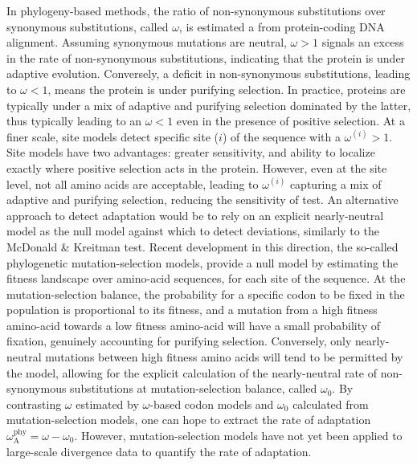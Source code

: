 \documentclass{article}
\newcommand{\rateApop}{\omega_{\mathrm{A}}}
\newcommand{\rateAphy}{\rateApop^{\mathrm{phy}}}
\begin{document}
    In phylogeny-based methods, the ratio of non-synonymous substitutions over synonymous substitutions, called $\omega$, is estimated a from protein-coding DNA alignment\cite{muse_likelihood_1994,goldman_codonbased_1994}.
    Assuming synonymous mutations are neutral, $\omega>1$ signals an excess in the rate of non-synonymous substitutions, indicating that the protein is under adaptive evolution.
    Conversely, a deficit in non-synonymous substitutions, leading to $\omega<1$, means the protein is under purifying selection.
    In practice, proteins are typically under a mix of adaptive and purifying selection dominated by the latter, thus typically leading to an $\omega<1$ even in the presence of positive selection.
    At a finer scale, site models detect specific site ($i$) of the sequence with a $\omega^{(i)}>1$\cite{yang_codonsubstitution_2000, kosiol_patterns_2008}.
    Site models have two advantages: greater sensitivity, and ability to localize exactly where positive selection acts in the protein.
    However, even at the site level, not all amino acids are acceptable, leading to $\omega^{(i)}$ capturing a mix of adaptive and purifying selection, reducing the sensitivity of test.
    An alternative approach to detect adaptation would be to rely on an explicit nearly-neutral model as the null model against which to detect deviations, similarly to the McDonald \& Kreitman test.
    Recent development in this direction, the so-called phylogenetic mutation-selection models, provide a null model by estimating the fitness landscape over amino-acid sequences, for each site of the sequence\cite{yang_mutationselection_2008, halpern_evolutionary_1998, rodrigue_mechanistic_2010}.
    At the mutation-selection balance, the probability for a specific codon to be fixed in the population is proportional to its fitness, and a mutation from a high fitness amino-acid towards a low fitness amino-acid will have a small probability of fixation, genuinely accounting for purifying selection.
    Conversely, only nearly-neutral mutations between high fitness amino acids will tend to be permitted by the model, allowing for the explicit calculation of the nearly-neutral rate of non-synonymous substitutions at mutation-selection balance, called $\omega_{0}$\cite{spielman_relationship_2015, rodrigue_detecting_2017}.
    By contrasting $\omega$ estimated by $\omega$-based codon models and $\omega_{0}$ calculated from mutation-selection models, one can hope to extract the rate of adaptation $\rateAphy = \omega - \omega_{0}$.
    However, mutation-selection models have not yet been applied to large-scale divergence data to quantify the rate of adaptation\cite{rodrigue_detecting_2017}.
\end{document}
